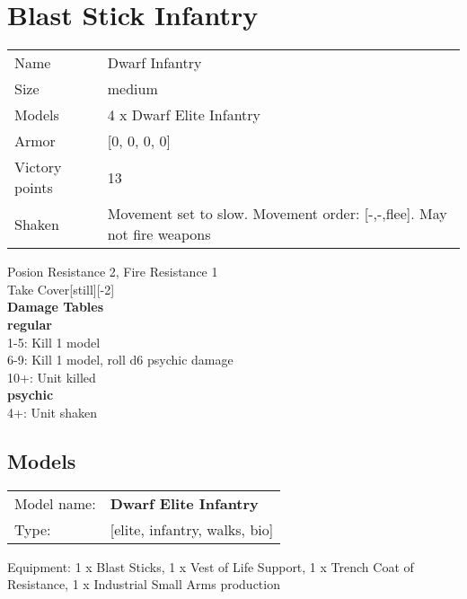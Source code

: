  















\clearpage

\section{ Blast Stick Infantry }

\begin{tabular}{ll}
  Name & Dwarf Infantry \\
  Size & medium\\
  Models & 4 x Dwarf Elite Infantry\\
  Armor & [0, 0, 0, 0]\\
  Victory points & 13\\
  Shaken & Movement set to slow. Movement order: [-,-,flee]. May not fire weapons\\
\end{tabular}

Posion Resistance 2, Fire Resistance 1\\ 
Take Cover[still][-2]\\ 



{\bf Damage Tables} \\
 {\bf regular } \\
1-5: Kill 1 model \\
6-9: Kill 1 model, roll d6 psychic damage \\
10+: Unit killed \\
 {\bf psychic } \\
4+: Unit shaken \\


\clearpage

\subsection{ Models }

\begin{tabular}{ll}
Model name: & {\bf Dwarf Elite Infantry } \\
Type: & [elite, infantry, walks, bio] \\
\end{tabular}

Equipment: 1 x Blast Sticks, 1 x Vest of Life Support, 1 x Trench Coat of Resistance, 1 x Industrial Small Arms production \\

